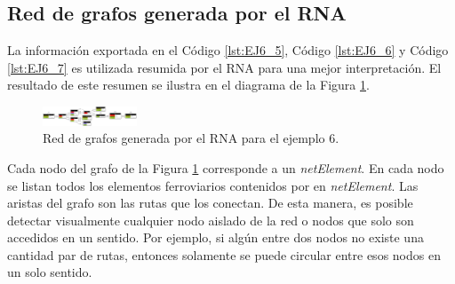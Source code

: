 \subsection{Red de grafos generada por el RNA}

	La información exportada en el Código \ref{lst:EJ6_5}, Código \ref{lst:EJ6_6} y Código \ref{lst:EJ6_7} es utilizada resumida por el RNA para una mejor interpretación. El resultado de este resumen se ilustra en el diagrama de la Figura \ref{fig:EJ6_8}.
	
	\begin{figure}[H]
		\centering
		\includegraphics[angle = 90, origin = c, width=0.25\textwidth]{Figuras/Graph_6}
		\centering\caption{Red de grafos generada por el RNA para el ejemplo 6.}
		\label{fig:EJ6_8}
	\end{figure}
	
	Cada nodo del grafo de la Figura \ref{fig:EJ6_8} corresponde a un \textit{netElement}. En cada nodo se listan todos los elementos ferroviarios contenidos por en \textit{netElement}. Las aristas del grafo son las rutas que los conectan. De esta manera, es posible detectar visualmente cualquier nodo aislado de la red o nodos que solo son accedidos en un sentido. Por ejemplo, si algún entre dos nodos no existe una cantidad par de rutas, entonces solamente se puede circular entre esos nodos en un solo sentido.